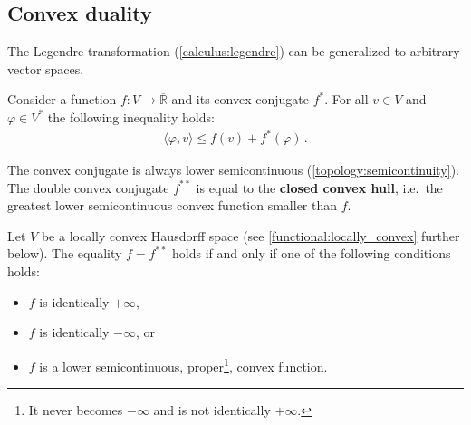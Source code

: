 \subsection{Convex duality}

    The Legendre transformation (\cref{calculus:legendre}) can be generalized to arbitrary vector spaces.
    \begin{property}
        Consider a function $f:V\rightarrow\overline{\mathbb{R}}$ and its convex conjugate $f^*$. For all $v\in V$ and $\varphi\in V^*$ the following inequality holds:
        \begin{gather}
            \langle\varphi,v\rangle\leq f(v)+f^*(\varphi)\,.
        \end{gather}
    \end{property}

    \begin{property}
        The convex conjugate is always lower semicontinuous (\cref{topology:semicontinuity}). The double convex conjugate $f^{**}$ is equal to the \textbf{closed convex hull}, i.e.~the greatest lower semicontinuous convex function smaller than $f$.
    \end{property}

    \begin{theorem}
        Let $V$ be a locally convex Hausdorff space (see \cref{functional:locally_convex} further below). The equality $f=f^{**}$ holds if and only if one of the following conditions holds:
        \begin{itemize}
            \item $f$ is identically $+\infty$,
            \item $f$ is identically $-\infty$, or
            \item $f$ is a lower semicontinuous, proper\footnote{It never becomes $-\infty$ and is not identically $+\infty$.}, convex function.
        \end{itemize}
    \end{theorem}


